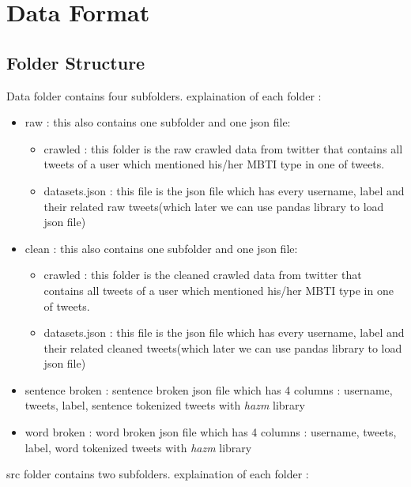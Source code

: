 \documentclass[10pt, a4paper]{article}
\begin{document}
\section{Data Format}

\subsection{Folder Structure}
Data folder contains four subfolders. explaination of each folder :
\begin{itemize}
    \item raw : this also contains one subfolder and one json file:
          \begin{itemize}
              \item crawled : this folder is the raw crawled data from twitter that contains all tweets of a user which mentioned
                    his/her MBTI type in one of tweets.
              \item datasets.json : this file is the json file which has every username, label and their related raw tweets(which later we can use pandas library to load json file)
          \end{itemize}
    \item clean : this also contains one subfolder and one json file:
          \begin{itemize}
              \item crawled : this folder is the cleaned crawled data from twitter that contains all tweets of a user which mentioned
                    his/her MBTI type in one of tweets.
              \item datasets.json : this file is the json file which has every username, label and their related cleaned tweets(which later we can use pandas library to load json file)
          \end{itemize}
    \item sentence broken : sentence broken json file which has 4 columns : username, tweets, label, sentence tokenized tweets with \textit{hazm} library
    \item word broken : word broken json file which has 4 columns : username, tweets, label, word tokenized tweets with \textit{hazm} library
\end{itemize}
src folder contains two subfolders. explaination of each folder :
\end{document}

